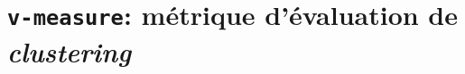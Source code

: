 \label{annex:D-ANNEXE-TECHNIQUE}


	\minitoc

	\section{\texttt{v-measure}: métrique d'évaluation de \textit{clustering}}
	\label{annex:D.1-TECHNIQUE-VMEASURE}
